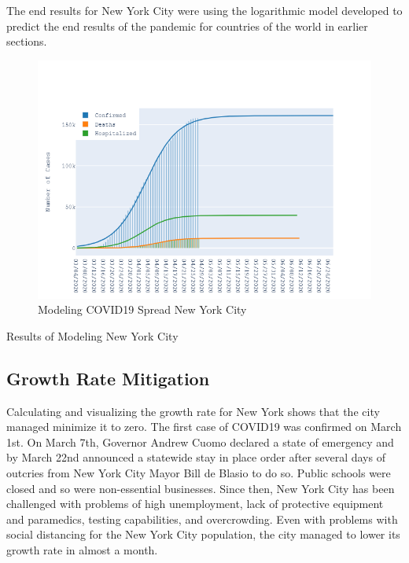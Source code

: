 \documentclass{homework}
\begin{document}
The end results for New York City were using the logarithmic model developed to predict the end results of the pandemic for countries of the world in earlier sections. 

\begin{figure}[H]
  \centering
  \includegraphics[scale=0.45]{task5/modeling.png}
  \caption{Modeling COVID19 Spread New York City}
\end{figure}

\begin{table}[H]
  \caption{Results of Modeling New York City}
  \label{Task 5 New York City}
  \centering
  
\end{table}

\newpage
\subsection{Growth Rate Mitigation} 

Calculating and visualizing the growth rate for New York shows that the city managed minimize it to zero. The first case of COVID19 was confirmed on March 1st. On March 7th, Governor Andrew Cuomo declared a state of emergency and by March 22nd announced a statewide stay in place order after several days of outcries from New York City Mayor Bill de Blasio to do so. Public schools were closed and so were non-essential businesses. Since then, New York City has been challenged with problems of high unemployment, lack of protective equipment and paramedics, testing capabilities, and overcrowding. Even with problems with social distancing for the New York City population, the city managed to lower its growth rate in almost a month. 
\end{document}
